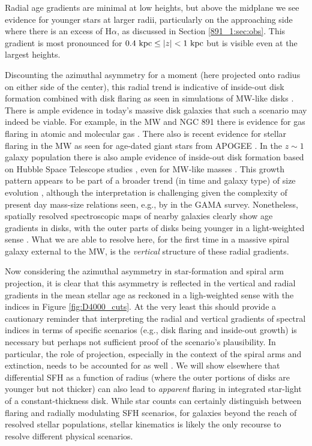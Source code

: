 Radial age gradients are minimal at low heights, but above the
midplane we see evidence for younger stars at larger radii,
particularly on the approaching side where there is an excess of
H$\alpha$, as discussed in Section \ref{891_1:sec:obs}. This gradient is
most pronounced for $0.4~\mathrm{kpc}  \leq |z| < 1~\mathrm{kpc} $ but is
visible even at the largest heights.

Discounting the azimuthal asymmetry for a moment (here projected onto
radius on either side of the center), this radial trend is indicative
of inside-out disk formation combined with disk flaring as seen in
simulations of MW-like disks \citep[e.g.,][]{Martig14a}. There is
ample evidence in today's massive disk galaxies that such a scenario
may indeed be viable. For example, in the MW and NGC 891 there is
evidence for gas flaring in atomic and molecular gas \citep[e.g.,][for
  NGC 891]{Scoville93, Yim11}. There also is recent evidence for
stellar flaring in the MW \citep{Ness16} as seen for age-dated giant
stars from APOGEE \citep{Majewski15}. In the $z\sim1$ galaxy
population there is also ample evidence of inside-out disk formation
based on Hubble Space Telescope studies \citep[e.g.,][]{Nelson15},
even for MW-like masses \citep[e.g.,][]{vanDokkum13}. This growth
pattern appears to be part of a broader trend (in time and galaxy
type) of size evolution \citep[e.g.,][]{Shibuya15}, although the
interpretation is challenging given the complexity of present day
mass-size relations seen, e.g., by \citet{Lange15} in the GAMA survey.
Nonetheless, spatially resolved spectroscopic maps of nearby galaxies
clearly show age gradients in disks, with the outer parts of disks
being younger in a light-weighted sense
\citep{Sanchez-Blazquez14,Gonzalez-Delgado15}. What we are able to
resolve here, for the first time in a massive spiral galaxy external
to the MW, is the {\it vertical} structure of these radial gradients.

Now considering the azimuthal asymmetry in star-formation and spiral
arm projection, it is clear that this asymmetry is reflected in the
vertical and radial gradients in the mean stellar age as reckoned in a
ligh-weighted sense with the indices in Figure \ref{fig:D4000_cuts}.
At the very least this should provide a cautionary reminder that
interpreting the radial and vertical gradients of spectral indices in
terms of specific scenarios (e.g., disk flaring and inside-out growth)
is necessary but perhaps not sufficient proof of the scenario's
plausibility. In particular, the role of projection, especially in the
context of the spiral arms and extinction, needs to be accounted for
as well \citep[cf the relative excess of H$\alpha$ vs 24$\mu$
  emission, as discussed in][]{Kamphuis07b}. We will show elsewhere
that differential SFH as a function of radius (where the outer
portions of disks are younger but not thicker) can also lead to {\it
  apparent} flaring in integrated star-light of a constant-thickness
disk. While star counts can certainly distinguish between flaring and
radially modulating SFH scenarios, for galaxies beyond the reach of
resolved stellar populations, stellar kinematics is likely the only
recourse to resolve different physical scenarios.

